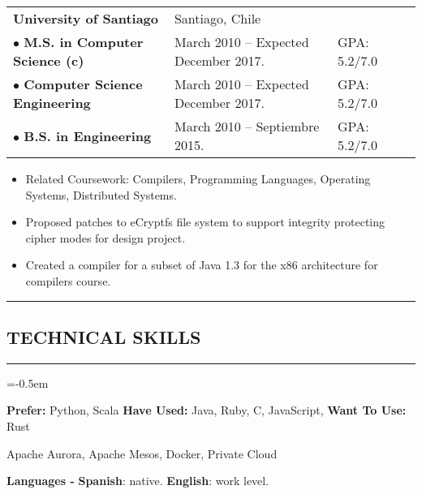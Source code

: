 \documentclass[10pt,letterpaper]{article}
\newcommand{\CPP}
{C\nolinebreak[4]\hspace{-.05em}\raisebox{.22ex}{\footnotesize\bf ++}}
\newcommand{\sectionTitle}[1]{
  \hrule
  \vspace{-1.0em} 
  \subsection*{\uppercase{\textbf{#1}}}
  \vspace{-0.3em}
    \hrule
    \vspace{0.5em}  
}
\newcommand{\languageSection}[4]{
  \vspace{-1.0em}
  \begin{center}
    \textbf{Languages - } \textbf{#1}: #2. \textbf{#3}: #4.
  \end{center}
}
\begin{document}
  \begin{tabular}{lllc} 
    \textbf{University of Santiago}&Santiago, Chile& & \\
    $\bullet$  \textbf{M.S. in Computer Science (c)}& March 2010 – Expected December 2017. & GPA: 5.2/7.0 & \\
    $\bullet$  \textbf{Computer Science Engineering} & March 2010 – Expected December 2017. & GPA: 5.2/7.0 & \\
    $\bullet$  \textbf{B.S. in Engineering} & March 2010 – Septiembre 2015. & GPA: 5.2/7.0  &\\
  \end{tabular}
  
  \begin{itemize}[label=\textbullet]
    \item Related Coursework: Compilers, Programming Languages, Operating
    Systems, Distributed Systems.
    \item Proposed patches to eCryptfs file system to support
    integrity protecting cipher modes for design project.
    \item Created a compiler for a subset of Java 1.3 for the
    x86 architecture for compilers course.
  \end{itemize}
  
  \sectionTitle{Technical Skills}
  
  \begin{description}[labelindent=\parindent]
    \parskip=-0.5em
    \item[Languages:] \textbf{Prefer:} Python, Scala \textbf{Have Used:} Java, Ruby, \CPP, JavaScript, \textbf{Want To Use:} Rust
    \item[Systems:] Apache Aurora, Apache Mesos, Docker, Private Cloud
  \end{description}
  
  \languageSection{Spanish}{native}{English}{work level}
  
\end{document}
